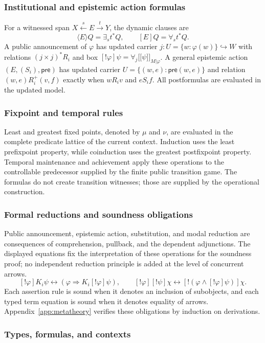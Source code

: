 \documentclass[11pt,a4paper]{article}
\numberwithin{equation}{section}
\theoremstyle{definition}
\theoremstyle{remark}
\theoremstyle{plain}
\providecommand{\llbracket}{\mathopen{[\![}}
\providecommand{\rrbracket}{\mathclose{]\!]}}
\begin{document}
\subsubsection{Institutional and epistemic action formulas}
For a witnessed span $X\xleftarrow{s}E\xrightarrow{t}Y$, the dynamic
clauses are
\[
\langle E\rangle Q=\exists_s t^*Q,\qquad
[E]Q=\forall_s t^*Q.
\]
A public announcement of $\varphi$ has updated carrier
$j:U=\{w: \varphi(w)\}\hookrightarrow W$ with relations
$(j\times j)^*R_i$ and box $[!\varphi]\psi=\forall_j
\llbracket\psi\rrbracket_{M|\varphi}$.  A general epistemic
action $(E,(S_i),\mathsf{pre})$ has updated carrier
$U=\{(w,e):\mathsf{pre}(w,e)\}$ and relation
$(w,e)R_i^+(v,f)$ exactly when $wR_iv$ and $eS_if$.
All postformulas are evaluated in the updated model.

\subsubsection{Fixpoint and temporal rules}
Least and greatest fixed points, denoted by $\mu$ and $\nu$,
are evaluated in the complete
predicate lattice of the current context. Induction uses the least
prefixpoint property, while coinduction uses the greatest postfixpoint
property. Temporal maintenance and achievement apply these operations
to the controllable predecessor supplied by the finite public
transition game. The formulas do not create transition witnesses; those
are supplied by the operational construction.

\subsubsection{Formal reductions and soundness obligations}
Public announcement, epistemic action, substitution, and modal
reduction are consequences of comprehension, pullback, and the
dependent adjunctions. The displayed equations fix the interpretation
of these operations for the soundness proof; no independent reduction
principle is added at the level of concurrent arrows.
\[
[!\varphi]K_i\psi\leftrightarrow
(\varphi\Rightarrow K_i[!\varphi]\psi),\qquad
[!\varphi][!\psi]\chi\leftrightarrow
[!(\varphi\wedge[!\varphi]\psi)]\chi.
\]
Each assertion rule is sound when it denotes an inclusion of
subobjects, and each typed term equation is sound when it denotes
equality of arrows. Appendix~\ref{app:metatheory} verifies these obligations
by induction on derivations.

\subsubsection{Types, formulas, and contexts}
\end{document}
